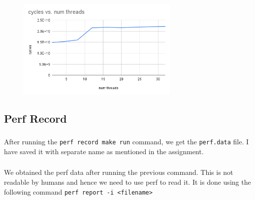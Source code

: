 \documentclass{article}
\begin{document}
\begin{figure}[H]
\centering
\includegraphics[width=0.7\textwidth]{images/cycles_threads.png}
\end{figure}

\subsection{Perf Record}
\subsubsection{}
After running the \texttt{perf record make run} command, we get the \texttt{perf.data} file. I have saved it with separate name as mentioned in the assignment.

\subsubsection{}
We obtained the perf data after running the previous command. This is not readable by humans and hence we need to use perf to read it. It is done using the following command \texttt{perf report -i <filename>}
\end{document}
